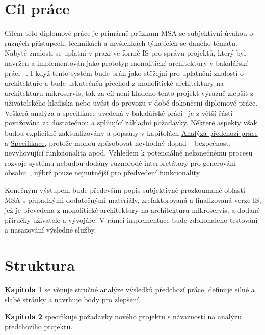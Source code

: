 \section{Cíl práce}\label{sec:cil-prace}
Cílem této diplomové práce je primárně průzkum \gls{MSA} se subjektivní úvahou o různých přístupech, technikách a myšlenkách týkajících se daného tématu.
Nabyté znalosti se uplatní v praxi ve formě \gls{IS} pro správu projektů, který byl navržen a implementován jako prototyp monolitické architektury v bakalářské práci ~\cite{bachelorthesis}.
I když tento systém bude brán jako stěžejní pro uplatnění znalostí o architektuře a bude uskutečněn přechod z monolitické architektury na architekturu mikroservis, tak za cíl není kladeno tento projekt výrazně zlepšit z uživatelského hlediska nebo uvést do provozu v době dokončení diplomové práce.
Veškerá analýza a specifikace uvedená v bakalářské práci~\cite{bachelorthesis} je z větší části považována za dostatečnou a splňující základní požadavky.
Některé aspekty však budou explicitně zaktualizovány a popsány v kapitolách \hyperref[ch:analysis]{Analýza předchozí práce} a \hyperref[ch:specification]{Specifikace}, protože mohou způsobovat nevhodný dopad -- bezpečnost, nevyhovující funkcionalita apod.
Vzhledem k potenciálně nekonečnému procesu rozvoje systému nebudou dodány různorodé interpretátory pro generování obsahu~\cite{bachelorthesis}, nýbrž pouze nejnutnější pro předvedení funkcionality.

Konečným výstupem bude především popis subjektivně prozkoumané oblasti \gls{MSA} s případnými dodatečnými materiály, zrefaktorovaná a finalizovaná verze \gls{IS}, jež je převedena z monolitické architektury na architekturu mikroservis, a dodané příručky uživatele a vývojáře.
V rámci implementace bude zdokonaleno testování a nasazování výsledné služby.


\clearpage



\section{Struktura}\label{sec:struktura}

\textbf{Kapitola 1} se věnuje stručné analýze výsledků předchozí práce, definuje silné a slabé stránky a navrhuje body pro zlepšení.

\textbf{Kapitola 2} specifikuje požadavky nového projektu s návazností na analýzu předchozího projektu.

